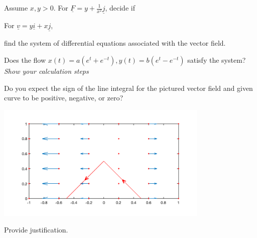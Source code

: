 \documentclass[12pt,letterpaper,noanswers]{exam}
\newcommand{\mb}[1]{\underline{#1}}
\begin{document}
 \pdfpageheight 11in 
  \pdfpagewidth 8.5in



\begin{questions}
\question Assume $x,y>0$.  For $\mb F = y +\frac{1}{x^2}\mb j$, decide if

\vspace{0.5in}

\item For $\mb v = y\mb i + x\mb j$,
\begin{parts}
\item find the system of differential equations associated with the vector field.
\vspace{0.6in}
\item Does the flow $x(t) = a(e^t+e^{-t}), y(t) = b(e^t-e^{-t})$ satisfy the system?  \emph{Show your calculation steps}
\end{parts}
\vfill

\item Do you expect the sign of the line integral for the pictured vector field and given curve to be positive, negative, or zero?

\includegraphics[width=4in]{img/C21lineintegral-p3.png}

Provide justification.

\vfill

\end{questions}
\end{document}

